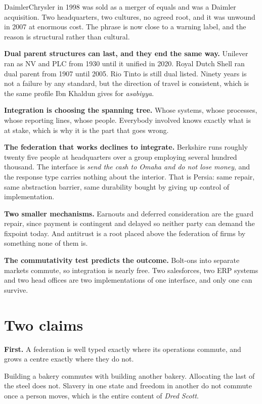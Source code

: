 \documentclass[11pt,a4paper]{article}
\begin{document}
DaimlerChrysler in 1998 was sold as a merger of equals and was a Daimler
acquisition. Two headquarters, two cultures, no agreed root, and it was unwound in
2007 at enormous cost. The phrase is now close to a warning label, and the reason is
structural rather than cultural.

\textbf{Dual parent structures can last, and they end the same way.} Unilever ran as
NV and PLC from 1930 until it unified in 2020. Royal Dutch Shell ran dual parent
from 1907 until 2005. Rio Tinto is still dual listed. Ninety years is not a failure
by any standard, but the direction of travel is consistent, which is the same
profile Ibn Khaldun gives for \emph{asabiyya}.

\textbf{Integration is choosing the spanning tree.} Whose systems, whose processes,
whose reporting lines, whose people. Everybody involved knows exactly what is at
stake, which is why it is the part that goes wrong.

\textbf{The federation that works declines to integrate.} Berkshire runs roughly
twenty five people at headquarters over a group employing several hundred thousand.
The interface is \emph{send the cash to Omaha and do not lose money}, and the
response type carries nothing about the interior. That is Persia: same repair, same
abstraction barrier, same durability bought by giving up control of implementation.

\textbf{Two smaller mechanisms.} Earnouts and deferred consideration are the guard
repair, since payment is contingent and delayed so neither party can demand the
fixpoint today. And antitrust is a root placed above the federation of firms by
something none of them is.

\textbf{The commutativity test predicts the outcome.} Bolt-ons into separate markets
commute, so integration is nearly free. Two salesforces, two ERP systems and two
head offices are two implementations of one interface, and only one can survive.

\section{Two claims}

\begin{sectionbox}
\textbf{First.} A federation is well typed exactly where its operations commute, and
grows a centre exactly where they do not.

Building a bakery commutes with building another bakery. Allocating the last of the
steel does not. Slavery in one state and freedom in another do not commute once a
person moves, which is the entire content of \emph{Dred Scott}.
\end{sectionbox}
\end{document}
